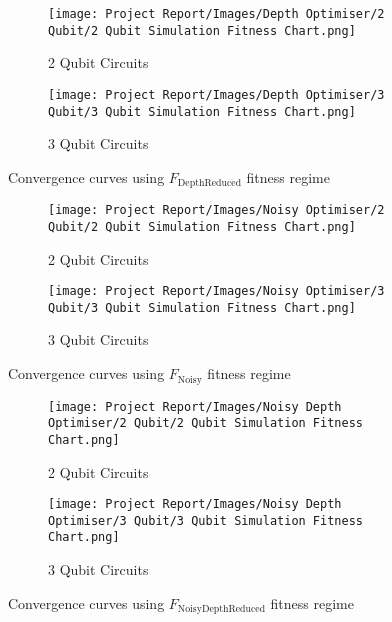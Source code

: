 \documentclass[11pt,a4paper]{article}
\begin{document}
\begin{figure}[H]
    \centering
    \begin{subfigure}{.5\textwidth}
        \centering
        \texttt{[image: Project Report/Images/Depth Optimiser/2 Qubit/2 Qubit Simulation Fitness Chart.png]}
        \caption{2 Qubit Circuits}
        \label{fig:depth_fitness_2q}
    \end{subfigure}%
    \begin{subfigure}{.5\textwidth}
        \centering
        \texttt{[image: Project Report/Images/Depth Optimiser/3 Qubit/3 Qubit Simulation Fitness Chart.png]}
        \caption{3 Qubit Circuits}
        \label{fig:depth_fitness_3q}
    \end{subfigure}
    \caption{Convergence curves using $F_{\mathrm{DepthReduced}}$ fitness regime}
    \label{fig:depth_fitness_charts}
\end{figure}

\begin{figure}[H]
    \centering
    \begin{subfigure}{.5\textwidth}
        \centering
        \texttt{[image: Project Report/Images/Noisy Optimiser/2 Qubit/2 Qubit Simulation Fitness Chart.png]}
        \caption{2 Qubit Circuits}
        \label{fig:noisy_fitness_2q}
    \end{subfigure}%
    \begin{subfigure}{.5\textwidth}
        \centering
        \texttt{[image: Project Report/Images/Noisy Optimiser/3 Qubit/3 Qubit Simulation Fitness Chart.png]}
        \caption{3 Qubit Circuits}
        \label{fig:noisy_fitness_3q}
    \end{subfigure}
\caption{Convergence curves using $F_{\mathrm{Noisy}}$ fitness regime}
\label{fig:noisy_fitness_charts}
\end{figure}

\begin{figure}[H]
    \centering
    \begin{subfigure}{.5\textwidth}
        \centering
        \texttt{[image: Project Report/Images/Noisy Depth Optimiser/2 Qubit/2 Qubit Simulation Fitness Chart.png]}
        \caption{2 Qubit Circuits}
        \label{fig:noisy_depth_fitness_2q}
    \end{subfigure}%
    \begin{subfigure}{.5\textwidth}
        \centering
        \texttt{[image: Project Report/Images/Noisy Depth Optimiser/3 Qubit/3 Qubit Simulation Fitness Chart.png]}
        \caption{3 Qubit Circuits}
        \label{fig:noisy_depth_fitness_3q}
    \end{subfigure}
    \caption{Convergence curves using $F_{\mathrm{NoisyDepthReduced}}$ fitness regime}
    \label{fig:noisy_depth_fitness_charts}
\end{figure}
\end{document}
